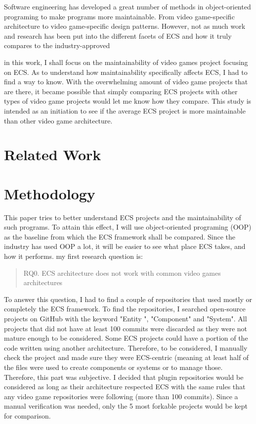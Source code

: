 \documentclass{IEEEcsmag}
\begin{document}
Software engineering has developed a great number of methods in object-oriented programing to make programs more maintainable. From video game-specific architecture to video game-specific design patterns. However, not as much work and research has been put into the different facets of ECS and how it truly compares to the industry-approved 

in this work, I shall focus on the maintainability of video games project focusing on ECS. As to understand how maintainability specifically affects ECS, I had to find a way to know. With the overwhelming amount of video game projects that are there, it became possible that simply comparing ECS projects with other types of video game projects would let me know how they compare. This study is intended as an initiation to see if the average ECS project is more maintainable than  other video game architecture.

\section{Related Work}


\section{Methodology}


This paper tries to better understand ECS projects and the maintainability of such programs. To attain this effect,  I will use object-oriented programing (OOP) as the baseline from which the ECS framework shall be compared. Since the industry has used OOP a lot, it will be easier to see what place ECS takes, and how it performs. my first research question is: 
\begin{quote}
    RQ0. ECS architecture does not work with common video games architectures
\end{quote}

To answer this question, I had to find a couple of repositories that used mostly or completely the ECS framework. To find the repositories, I searched open-source projects on GitHub with the keyword "Entity ", "Component" and "System". All projects that did not have at least 100 commits were discarded as they were not mature enough to be considered. Some  ECS projects could have a portion of the code written using another architecture. Therefore, to be considered, I manually check the project and made sure they were ECS-centric (meaning at least half of the files were used to create components or systems or to manage those. Therefore, this part was subjective. I decided that plugin repositories would be considered as long as their architecture respected ECS with the same rules that any video game repositories were following (more than 100 commits). Since a manual verification was needed, only the 5 most forkable projects would be kept for comparison.
\end{document}
